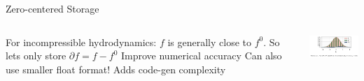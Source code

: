 \begin{frame}{Zero-centered Storage}
\begin{columns}
\begin{outline}
  \1 For incompressible hydrodynamics: 
  \1 $f$ is generally close to $f^0$.
  \1 So lets only store $\partial f = f - f^0$
  \1 Improve numerical accuracy
  \1 Can also use smaller float format!
  \1 Adds code-gen complexity
\end{outline}


\centering
\begin{center}
  \includegraphics[width=5cm]{fig_2.1.png}
\end{center}
\end{columns}
\end{frame}
